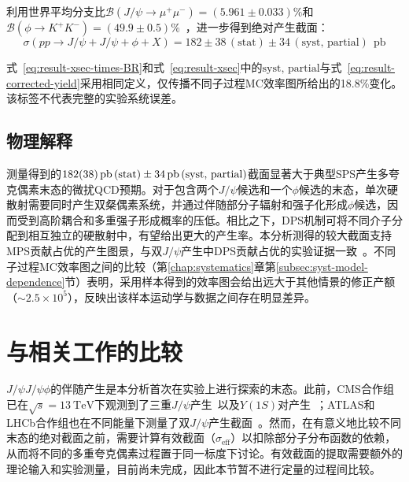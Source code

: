 利用世界平均分支比$\mathcal{B}(J/\psi \to \mu^+\mu^-) = (5.961 \pm 0.033)\%$和$\mathcal{B}(\phi \to K^+K^-) = (49.9 \pm 0.5)\%$~\cite{PDG2024}，进一步得到绝对产生截面：
\begin{equation}
\label{eq:result-xsec}
\sigma(pp \to J/\psi + J/\psi + \phi + X) = 182 \pm 38\,(\mathrm{stat}) \pm 34\,(\mathrm{syst,\,partial})~\SI{}{\pico\barn}
\end{equation}

式~\eqref{eq:result-xsec-times-BR}和式~\eqref{eq:result-xsec}中的$\mathrm{syst,\,partial}$与式~\eqref{eq:result-corrected-yield}采用相同定义，仅传播不同子过程MC效率图所给出的18.8\%变化。该标签不代表完整的实验系统误差。

\subsection{物理解释}

测量得到的$\SI{182 \pm 38}{\pico\barn}\,(\mathrm{stat}) \pm \SI{34}{\pico\barn}\,(\mathrm{syst,\,partial})$截面显著大于典型SPS产生多夸克偶素末态的微扰QCD预期。对于包含两个$J/\psi$候选和一个$\phi$候选的末态，单次硬散射需要同时产生双粲偶素系统，并通过伴随部分子辐射和强子化形成$\phi$候选，因而受到高阶耦合和多重强子形成概率的压低。相比之下，DPS机制可将不同介子分配到相互独立的硬散射中，有望给出更大的产生率。本分析测得的较大截面支持MPS贡献占优的产生图景，与双$J/\psi$产生中DPS贡献占优的实验证据一致~\cite{CMS_TRI_JPSI}。不同子过程MC效率图之间的比较（第\ref{chap:systematics}章第\ref{subsec:syst-model-dependence}节）表明，采用\SPSLO 样本得到的效率图会给出远大于其他情景的修正产额（$\sim 2.5 \times 10^5$），反映出该样本运动学与数据之间存在明显差异。

\section{与相关工作的比较}
\label{sec:comparison-related}

$J/\psi J/\psi \phi$的伴随产生是本分析首次在实验上进行探索的末态。此前，CMS合作组已在$\sqrt{s} = \SI{13}{\tera\eV}$下观测到了三重$J/\psi$产生~\cite{CMS_TRI_JPSI}以及$Y(1S)$对产生~\cite{CMSY1SY1S13TeV2020}；ATLAS和LHCb合作组也在不同能量下测量了双$J/\psi$产生截面~\cite{ATLAS_JPSIJPSI_8TEV,LHCbJpsiJpsi13TeV2017,LHCbJpsiJpsi13TeV2024}。然而，在有意义地比较不同末态的绝对截面之前，需要计算有效截面（$\sigma_{\mathrm{eff}}$）以扣除部分子分布函数的依赖，从而将不同的多重夸克偶素过程置于同一标度下讨论。有效截面的提取需要额外的理论输入和实验测量，目前尚未完成，因此本节暂不进行定量的过程间比较。

